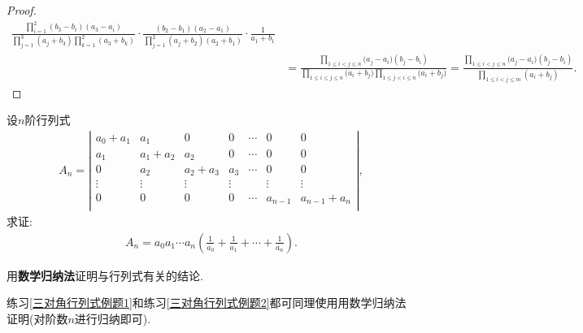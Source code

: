 \documentclass[../../main.tex]{subfiles}
\begin{document}
\begin{proof}
\begin{align*}
\frac{\prod\limits_{i=1}^2{\left( b_3-b_i \right) \left( a_3-a_i \right)}}{\prod\limits_{j=1}^3{\left( a_j+b_3 \right) \prod\limits_{k=1}^2{\left( a_3+b_k \right)}}}\cdot \frac{\left( b_2-b_1 \right) \left( a_2-a_1 \right)}{\prod\limits_{j=1}^2{\left( a_j+b_2 \right) \left( a_2+b_1 \right)}}\cdot \frac{1}{a_1+b_1}
\\
&=\frac{\prod\limits_{1\le i<j\le n}{(a_j}-a_i)(b_j-b_i)}{\prod\limits_{1\le i\le j\le n}{(a_i}+b_j)\prod\limits_{1\le j<i\le n}{(a_i}+b_j)}=\frac{\prod\limits_{1\le i<j\le n}{(a_j}-a_i)(b_j-b_i)}{\prod\limits_{1\leqslant i<j\leqslant m}{\left( a_i+b_j \right)}}.
\nonumber
\end{align*}

\end{proof}

\begin{example}\label{使用数学归纳法计算行列式例题1}
    设$n$阶行列式
    \begin{align}
    A_n=\left| \begin{matrix}
    a_0+a_1&		a_1&		0&		0&		\cdots&		0&		0\\
    a_1&		a_1+a_2&		a_2&		0&		\cdots&		0&		0\\
    0&		a_2&		a_2+a_3&		a_3&		\cdots&		0&		0\\
    \vdots&		\vdots&		\vdots&		\vdots&		&		\vdots&		\vdots\\
    0&		0&		0&		0&		\cdots&		a_{n-1}&		a_{n-1}+a_n\\
    \end{matrix} \right|,
    \nonumber
    \end{align}
    求证:
    \begin{align}
    A_n=a_0a_1\cdots a_n\left( \frac{1}{a_0}+\frac{1}{a_1}+\cdots +\frac{1}{a_n} \right) .
    \nonumber
    \end{align}
    \end{example}
    \begin{note}
    用\hypertarget{用数学归纳法与行列式有关的结论}{\textbf{数学归纳法}}证明与行列式有关的结论.
    
    练习\ref{三对角行列式例题1}和练习\ref{三对角行列式例题2}都可同理使用用数学归纳法证明(对阶数$n$进行归纳即可).
    \end{note}
\end{document}
